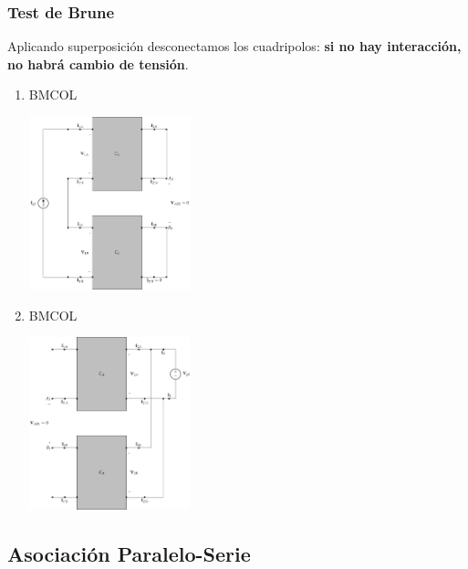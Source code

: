 \subsubsection{Test de Brune}
\label{sec:orgb1acd8e}
Aplicando superposición desconectamos los cuadripolos: \textbf{si no hay interacción, no habrá cambio de tensión}.
\begin{enumerate}
\item \hfill{}\textsc{BMCOL}
\label{sec:orge70fe59}
\begin{center}
\includegraphics[height=5cm]{../figs/serie-paralelo-brune-entrada.pdf}
\end{center}
\item \hfill{}\textsc{BMCOL}
\label{sec:orgfd2f144}
\begin{center}
\includegraphics[height=5cm]{../figs/serie-paralelo-brune-salida.pdf}
\end{center}
\end{enumerate}

\subsection{Asociación Paralelo-Serie}
\label{sec:orgd91e058}
